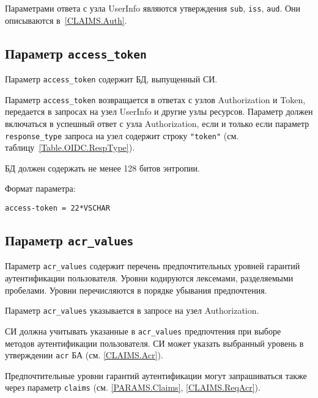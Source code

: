 Параметрами ответа с узла UserInfo являются утверждения \lstinline{sub}, 
\lstinline{iss}, \lstinline{aud}. Они описываются в~\ref{CLAIMS.Auth}.

\subsection{Параметр \lstinline{access_token}}\label{PARAMS.AccessToken}

Параметр \lstinline{access_token} содержит БД, выпущенный СИ.

Параметр \lstinline{access_token} возвращается в ответах с узлов Authorization и 
Token, передается в запросах на узел UserInfo и другие узлы ресурсов.
%
Параметр должен включаться в успешный ответ с узла 
Authorization, если и только если параметр \lstinline{response_type} запроса 
на узел содержит строку \lstinline{"token"} 
(см. таблицу~\ref{Table.OIDC.RespType}).

БД должен содержать не менее 128 битов энтропии.

Формат параметра:
\begin{lstlisting}
access-token = 22*VSCHAR
\end{lstlisting}


\subsection{Параметр \lstinline{acr_values}}\label{PARAMS.AcrValues} 

Параметр \lstinline{acr_values} содержит перечень предпочтительных
уровней гарантий аутентификации пользователя. Уровни кодируются лексемами, 
разделяемыми пробелами. Уровни перечисляются в порядке убывания предпочтения.

Параметр \lstinline{acr_values} указывается в запросе на узел Authorization.

СИ должна учитывать указанные в \lstinline{acr_values} предпочтения при выборе 
методов аутентификации пользователя.
% 
СИ может указать выбранный уровень в утверждении \lstinline{acr} БА 
(см. \ref{CLAIMS.Acr}).
%

\begin{note*}
Предпочтительные уровни гарантий аутентификации могут запрашиваться также через 
параметр \lstinline{claims} (см. \ref{PARAMS.Claims}, \ref{CLAIMS.ReqAcr}).
\end{note*}

